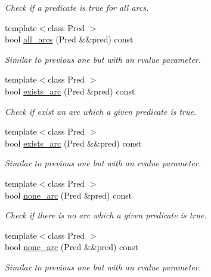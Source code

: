 \begin{DoxyCompactItemize}
\begin{DoxyCompactList}\small\item\em Check if a predicate is true for all arcs. \end{DoxyCompactList}\item 
{\footnotesize template$<$class Pred $>$ }\\bool \hyperlink{class_designar_1_1_base_graph_aea71a873faf7e92195d582b21d14c347}{all\+\_\+arcs} (Pred \&\&pred) const
\begin{DoxyCompactList}\small\item\em Similar to previous one but with an rvalue parameter. \end{DoxyCompactList}\item 
{\footnotesize template$<$class Pred $>$ }\\bool \hyperlink{class_designar_1_1_base_graph_aaed186c42ed6b51f761cda959ecde601}{exists\+\_\+arc} (Pred \&pred) const
\begin{DoxyCompactList}\small\item\em Check if exist an arc which a given predicate is true. \end{DoxyCompactList}\item 
{\footnotesize template$<$class Pred $>$ }\\bool \hyperlink{class_designar_1_1_base_graph_aebf517d972db553b03f2c4dbe4228d79}{exists\+\_\+arc} (Pred \&\&pred) const
\begin{DoxyCompactList}\small\item\em Similar to previous one but with an rvalue parameter. \end{DoxyCompactList}\item 
{\footnotesize template$<$class Pred $>$ }\\bool \hyperlink{class_designar_1_1_base_graph_a023f28dd8824ba7a0c26342effd0fddf}{none\+\_\+arc} (Pred \&pred) const
\begin{DoxyCompactList}\small\item\em Check if there is no arc which a given predicate is true. \end{DoxyCompactList}\item 
{\footnotesize template$<$class Pred $>$ }\\bool \hyperlink{class_designar_1_1_base_graph_a69c4841b8c517a510d738bc1204da7b7}{none\+\_\+arc} (Pred \&\&pred) const
\begin{DoxyCompactList}\small\item\em Similar to previous one but with an rvalue parameter. \end{DoxyCompactList}\item 

\end{DoxyCompactItemize}
